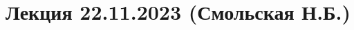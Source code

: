 \documentclass[main.tex]{subfiles}
\begin{document}
\section{Лекция 22.11.2023 (Смольская Н.Б.)}
\end{document}
